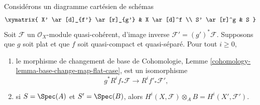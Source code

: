 \begin{lemma}
\label{lemma-flat-base-change-cohomology}
Considérons un diagramme cartésien de schémas
$$
\xymatrix{
X' \ar[d]_{f'} \ar[r]_{g'} & X \ar[d]^f \\
S' \ar[r]^g & S
}
$$
Soit $\mathcal{F}$ un $\mathcal{O}_X$-module quasi-cohérent,
d'image inverse $\mathcal{F}' = (g')^*\mathcal{F}$.
Supposons que $g$ soit plat et que $f$ soit quasi-compact et quasi-séparé.
Pour tout $i \geq 0$,
\begin{enumerate}
\item le morphisme de changement de base de
Cohomologie, Lemme \ref{cohomology-lemma-base-change-map-flat-case},
est un isomorphisme
$$
g^*R^if_*\mathcal{F} \longrightarrow R^if'_*\mathcal{F}',
$$
\item si $S = \Spec(A)$ et $S' = \Spec(B)$, alors
$H^i(X, \mathcal{F}) \otimes_A B = H^i(X', \mathcal{F}')$.
\end{enumerate}
\end{lemma}

